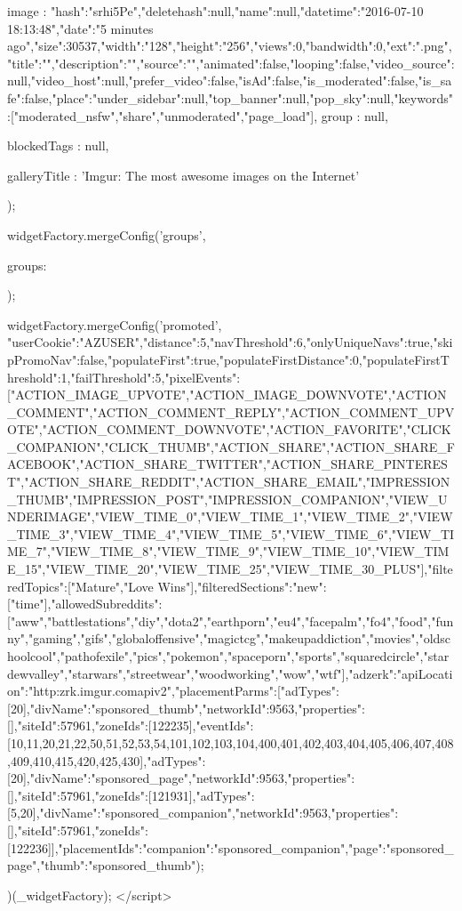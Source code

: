 {{{{            image               : {"hash":"srhi5Pe","deletehash":null,"name":null,"datetime":"2016-07-10 18:13:48","date":"5 minutes ago","size":30537,"width":"128","height":"256","views":0,"bandwidth":0,"ext":".png","title":"","description":"","source":"","animated":false,"looping":false,"video_source":null,"video_host":null,"prefer_video":false,"isAd":false,"is_moderated":false,"is_safe":false,"place":{"under_sidebar":null,"top_banner":null,"pop_sky":null,"keywords":["moderated_nsfw","share","unmoderated","page_load"]}},
            group               : null,
        
            blockedTags         : null,
        
        
            galleryTitle        : 'Imgur: The most awesome images on the Internet'
        });

        widgetFactory.mergeConfig('groups', {
            groups: {
                
            }
        });

        widgetFactory.mergeConfig('promoted', {"userCookie":"AZUSER","distance":5,"navThreshold":6,"onlyUniqueNavs":true,"skipPromoNav":false,"populateFirst":true,"populateFirstDistance":0,"populateFirstThreshold":1,"failThreshold":5,"pixelEvents":["ACTION_IMAGE_UPVOTE","ACTION_IMAGE_DOWNVOTE","ACTION_COMMENT","ACTION_COMMENT_REPLY","ACTION_COMMENT_UPVOTE","ACTION_COMMENT_DOWNVOTE","ACTION_FAVORITE","CLICK_COMPANION","CLICK_THUMB","ACTION_SHARE","ACTION_SHARE_FACEBOOK","ACTION_SHARE_TWITTER","ACTION_SHARE_PINTEREST","ACTION_SHARE_REDDIT","ACTION_SHARE_EMAIL","IMPRESSION_THUMB","IMPRESSION_POST","IMPRESSION_COMPANION","VIEW_UNDERIMAGE","VIEW_TIME_0","VIEW_TIME_1","VIEW_TIME_2","VIEW_TIME_3","VIEW_TIME_4","VIEW_TIME_5","VIEW_TIME_6","VIEW_TIME_7","VIEW_TIME_8","VIEW_TIME_9","VIEW_TIME_10","VIEW_TIME_15","VIEW_TIME_20","VIEW_TIME_25","VIEW_TIME_30_PLUS"],"filteredTopics":["Mature","Love Wins"],"filteredSections":{"new":["time"]},"allowedSubreddits":["aww","battlestations","diy","dota2","earthporn","eu4","facepalm","fo4","food","funny","gaming","gifs","globaloffensive","magictcg","makeupaddiction","movies","oldschoolcool","pathofexile","pics","pokemon","spaceporn","sports","squaredcircle","stardewvalley","starwars","streetwear","woodworking","wow","wtf"],"adzerk":{"apiLocation":"http:\/\/zrk.imgur.com\/api\/v2","placementParms":[{"adTypes":[20],"divName":"sponsored_thumb","networkId":9563,"properties":[],"siteId":57961,"zoneIds":[122235],"eventIds":[10,11,20,21,22,50,51,52,53,54,101,102,103,104,400,401,402,403,404,405,406,407,408,409,410,415,420,425,430]},{"adTypes":[20],"divName":"sponsored_page","networkId":9563,"properties":[],"siteId":57961,"zoneIds":[121931]},{"adTypes":[5,20],"divName":"sponsored_companion","networkId":9563,"properties":[],"siteId":57961,"zoneIds":[122236]}],"placementIds":{"companion":"sponsored_companion","page":"sponsored_page","thumb":"sponsored_thumb"}}});
    })(_widgetFactory);
    </script>

}}
